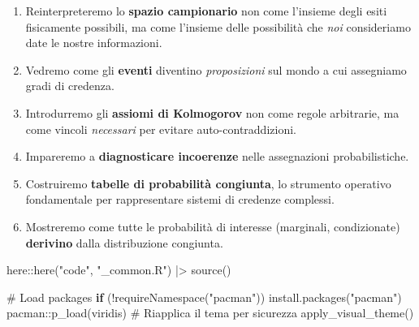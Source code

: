 \documentclass[
  italian,
  letterpaper,
  a4paper,
  11pt,
  open=any]{scrbook}
\newenvironment{Shaded}{\begin{snugshade}}{\end{snugshade}}
\newcommand{\CommentTok}[1]{\textcolor[rgb]{0.37,0.37,0.37}{#1}}
\newcommand{\ControlFlowTok}[1]{\textcolor[rgb]{0.00,0.23,0.31}{\textbf{#1}}}
\newcommand{\FunctionTok}[1]{\textcolor[rgb]{0.28,0.35,0.67}{#1}}
\newcommand{\NormalTok}[1]{\textcolor[rgb]{0.00,0.23,0.31}{#1}}
\newcommand{\SpecialCharTok}[1]{\textcolor[rgb]{0.37,0.37,0.37}{#1}}
\newcommand{\StringTok}[1]{\textcolor[rgb]{0.13,0.47,0.30}{#1}}
\theoremstyle{plain}
\theoremstyle{definition}
\theoremstyle{definition}
\theoremstyle{remark}
\begin{document}
\begin{enumerate}
\def\labelenumi{\arabic{enumi}.}
\item
  Reinterpreteremo lo \textbf{spazio campionario} non come l'insieme
  degli esiti fisicamente possibili, ma come l'insieme delle possibilità
  che \emph{noi} consideriamo date le nostre informazioni.
\item
  Vedremo come gli \textbf{eventi} diventino \emph{proposizioni} sul
  mondo a cui assegniamo gradi di credenza.
\item
  Introdurremo gli \textbf{assiomi di Kolmogorov} non come regole
  arbitrarie, ma come vincoli \emph{necessari} per evitare
  auto-contraddizioni.
\item
  Impareremo a \textbf{diagnosticare incoerenze} nelle assegnazioni
  probabilistiche.
\item
  Costruiremo \textbf{tabelle di probabilità congiunta}, lo strumento
  operativo fondamentale per rappresentare sistemi di credenze
  complessi.
\item
  Mostreremo come tutte le probabilità di interesse (marginali,
  condizionate) \textbf{derivino} dalla distribuzione congiunta.
\end{enumerate}

\begin{tcolorbox}[enhanced jigsaw, arc=.35mm, bottomrule=.15mm, bottomtitle=1mm, breakable, colback=white, colbacktitle=quarto-callout-caution-color!10!white, colframe=quarto-callout-caution-color-frame, coltitle=black, left=2mm, leftrule=.75mm, opacityback=0, opacitybacktitle=0.6, rightrule=.15mm, title=\textcolor{quarto-callout-caution-color}{\faFire}\hspace{0.5em}{Preparazione del Notebook}, titlerule=0mm, toprule=.15mm, toptitle=1mm]

\begin{Shaded}
\begin{Highlighting}[]
\NormalTok{here}\SpecialCharTok{::}\FunctionTok{here}\NormalTok{(}\StringTok{"code"}\NormalTok{, }\StringTok{"\_common.R"}\NormalTok{) }\SpecialCharTok{|\textgreater{}} 
  \FunctionTok{source}\NormalTok{()}

\CommentTok{\# Load packages}
\ControlFlowTok{if}\NormalTok{ (}\SpecialCharTok{!}\FunctionTok{requireNamespace}\NormalTok{(}\StringTok{"pacman"}\NormalTok{)) }\FunctionTok{install.packages}\NormalTok{(}\StringTok{"pacman"}\NormalTok{)}
\NormalTok{pacman}\SpecialCharTok{::}\FunctionTok{p\_load}\NormalTok{(viridis)}
\CommentTok{\# Riapplica il tema per sicurezza}
\FunctionTok{apply\_visual\_theme}\NormalTok{()}
\end{Highlighting}
\end{Shaded}

\end{tcolorbox}
\end{document}
